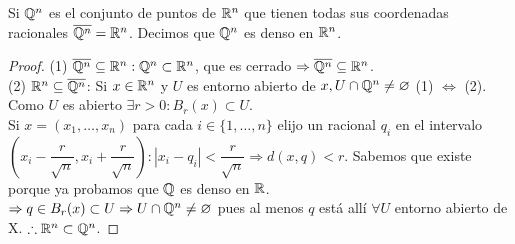 \begin{eg}
  Si \(\mathbb{Q}^n\) es el conjunto de puntos de \(\mathbb{R}^n\) que tienen todas sus coordenadas racionales \(\overline{\mathbb{Q}^n} = \mathbb{R}^n\). Decimos que \(\mathbb{Q}^n\) es denso en \(\mathbb{R}^n\).

  \begin{proof}
    (1) \(\overline{\mathbb{Q}^n} \subseteq \mathbb{R}^n : \mathbb{Q}^n \subset \mathbb{R}^n\), que es cerrado \(\Rightarrow \overline{\mathbb{Q}^n} \subseteq \mathbb{R}^n\). \\
    (2) \(\mathbb{R}^n \subseteq \overline{\mathbb{Q}^n}\): Si \(x \in \mathbb{R}^n\) y \(U\) es entorno abierto de \(x, U \cap \mathbb{Q}^n \neq \varnothing \) (1) \(\iff \) (2). Como \(U\) es abierto \(\exists r > 0 : B_r(x) \subset U\). \\
    Si \(x = (x_1, \ldots, x_n)\) para cada \(i \in \{1, \ldots, n\} \) elijo un racional \(q_i\) en el intervalo \((x_i - \dfrac{r}{\sqrt{n}}, x_i + \dfrac{r}{\sqrt{n}}) : |x_i - q_i| < \dfrac{r}{\sqrt{n}} \Rightarrow d(x, q) < r\). Sabemos que existe porque ya probamos que \(\mathbb{Q} \) es denso en \(\mathbb{R} \). \\
    \(\Rightarrow q \in B_r(x) \subset U \Rightarrow U \cap \mathbb{Q}^n \neq \varnothing \) pues al menos \(q\) está allí \(\forall U\) entorno abierto de X.
    \(\therefore \mathbb{R}^n \subset \mathbb{Q}^n\).
  \end{proof}
\end{eg}